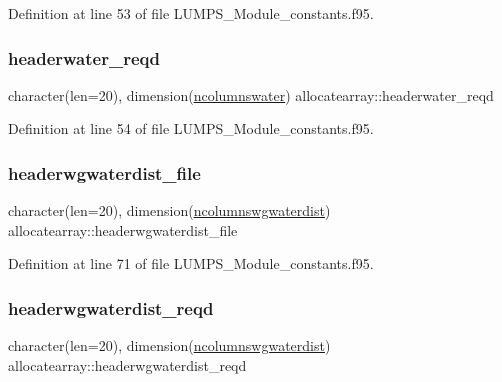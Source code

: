 Definition at line 53 of file L\+U\+M\+P\+S\+\_\+\+Module\+\_\+constants.\+f95.

\mbox{\label{namespaceallocatearray_a20a8727d12f806e513fcdbb3ebdc1482}} 
\subsubsection{\texorpdfstring{headerwater\+\_\+reqd}{headerwater\_reqd}}
{\footnotesize\ttfamily character(len=20), dimension(\hyperlink{namespaceallocatearray_a58f6aaf0837a4d8d3383254237a26732}{ncolumnswater}) allocatearray\+::headerwater\+\_\+reqd}



Definition at line 54 of file L\+U\+M\+P\+S\+\_\+\+Module\+\_\+constants.\+f95.

\mbox{\label{namespaceallocatearray_a1dc4be815337cd033a0c06090ecd9d45}} 
\subsubsection{\texorpdfstring{headerwgwaterdist\+\_\+file}{headerwgwaterdist\_file}}
{\footnotesize\ttfamily character(len=20), dimension(\hyperlink{namespaceallocatearray_a85d1a0c9782006900e2d2a379ba269c8}{ncolumnswgwaterdist}) allocatearray\+::headerwgwaterdist\+\_\+file}



Definition at line 71 of file L\+U\+M\+P\+S\+\_\+\+Module\+\_\+constants.\+f95.

\mbox{\label{namespaceallocatearray_af07ba3471074023fae170857b69c2a4e}} 
\subsubsection{\texorpdfstring{headerwgwaterdist\+\_\+reqd}{headerwgwaterdist\_reqd}}
{\footnotesize\ttfamily character(len=20), dimension(\hyperlink{namespaceallocatearray_a85d1a0c9782006900e2d2a379ba269c8}{ncolumnswgwaterdist}) allocatearray\+::headerwgwaterdist\+\_\+reqd}



